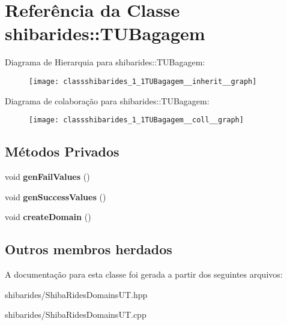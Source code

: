 \hypertarget{classshibarides_1_1TUBagagem}{}\section{Referência da Classe shibarides\+:\+:T\+U\+Bagagem}
\label{classshibarides_1_1TUBagagem}


Diagrama de Hierarquia para shibarides\+:\+:T\+U\+Bagagem\+:\nopagebreak
\begin{figure}[H]
\begin{center}
\leavevmode
\texttt{[image: classshibarides\_1\_1TUBagagem\_\_inherit\_\_graph]}
\end{center}
\end{figure}


Diagrama de colaboração para shibarides\+:\+:T\+U\+Bagagem\+:\nopagebreak
\begin{figure}[H]
\begin{center}
\leavevmode
\texttt{[image: classshibarides\_1\_1TUBagagem\_\_coll\_\_graph]}
\end{center}
\end{figure}
\subsection*{Métodos Privados}
\begin{DoxyCompactItemize}
\item 
void {\bfseries gen\+Fail\+Values} ()\hypertarget{classshibarides_1_1TUBagagem_a8d08a8261d4fcedb6d2d2a397f140701}{}\label{classshibarides_1_1TUBagagem_a8d08a8261d4fcedb6d2d2a397f140701}

\item 
void {\bfseries gen\+Success\+Values} ()\hypertarget{classshibarides_1_1TUBagagem_a74961c62d7b91b4888f61f99246ded66}{}\label{classshibarides_1_1TUBagagem_a74961c62d7b91b4888f61f99246ded66}

\item 
void {\bfseries create\+Domain} ()\hypertarget{classshibarides_1_1TUBagagem_a7d1f0a8580c87afdeed8866ddf927259}{}\label{classshibarides_1_1TUBagagem_a7d1f0a8580c87afdeed8866ddf927259}

\end{DoxyCompactItemize}
\subsection*{Outros membros herdados}


A documentação para esta classe foi gerada a partir dos seguintes arquivos\+:\begin{DoxyCompactItemize}
\item 
shibarides/Shiba\+Rides\+Domains\+U\+T.\+hpp\item 
shibarides/Shiba\+Rides\+Domains\+U\+T.\+cpp\end{DoxyCompactItemize}
